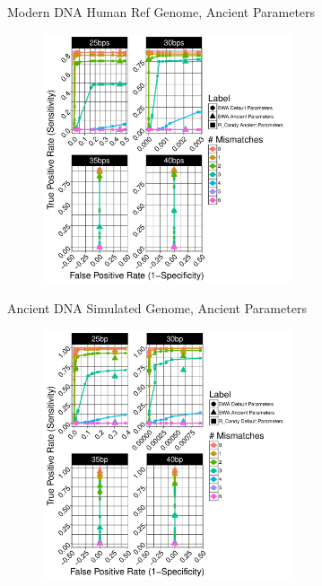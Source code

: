 \documentclass{beamer}
\begin{document}
\begin{frame}{\small{Modern DNA Human Ref Genome, Ancient Parameters}}
	\begin{figure}[H]
		\centering
		\includegraphics[width=7.35cm]{pics/f_DS9_22_20_54_emp.pdf}
		
	\end{figure}

\end{frame}
\begin{frame}{\small{Ancient DNA Simulated Genome, Ancient Parameters}}
	
	\begin{figure}[H]
		\centering
		\includegraphics[width=7.35cm]{pics/f_DS1_emp.pdf}
		
	\end{figure}

\end{frame}
\end{document}

